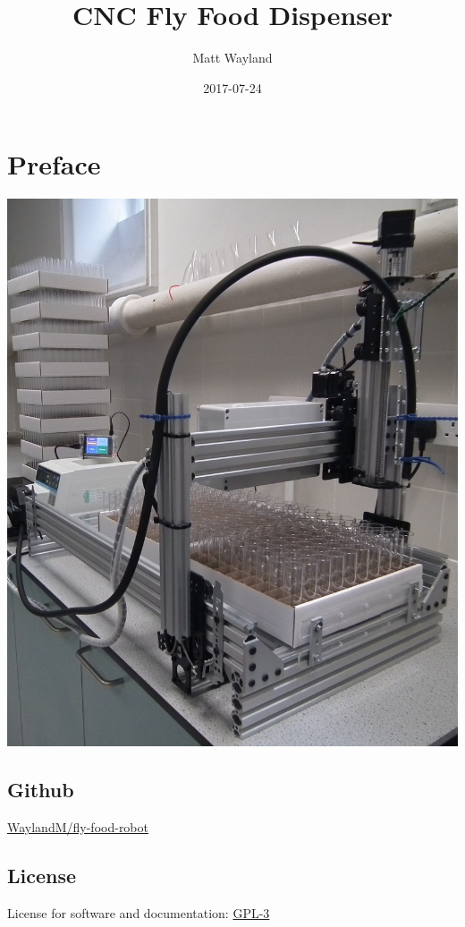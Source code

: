 \documentclass[]{book}
\title{CNC Fly Food Dispenser}
\author{Matt Wayland}
\date{2017-07-24}
\theoremstyle{definition}
\theoremstyle{definition}
\theoremstyle{remark}
\begin{document}
\maketitle

{
\setcounter{tocdepth}{1}
\tableofcontents
}
\chapter*{Preface}\label{preface}

\begin{center}\includegraphics[width=0.75\linewidth]{images/system} \end{center}

\section*{Github}\label{github}

\href{https://github.com/WaylandM/fly-food-robot}{WaylandM/fly-food-robot}

\section*{License}\label{license}

License for software and documentation:
\href{https://www.gnu.org/licenses/gpl-3.0.en.html}{GPL-3}
\end{document}
